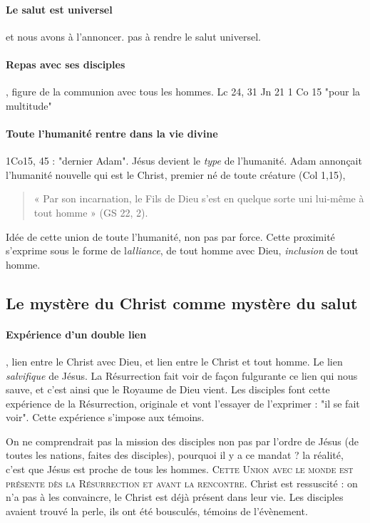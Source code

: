 \paragraph{Le salut est universel} et nous avons à l'annoncer. pas à rendre le salut universel. 

\paragraph{Repas avec ses disciples}, figure de la communion avec tous les hommes. 
Lc 24, 31
Jn 21
1 Co 15 "pour la multitude"

\paragraph{Toute l'humanité rentre dans la vie divine} 1Co15, 45 : "dernier Adam". Jésus devient le \textit{type } de l'humanité. Adam annonçait l'humanité nouvelle qui est le Christ, premier né de toute créature (Col 1,15),  
  
 \begin{quote}
     «  Par  son  incarnation,  le  Fils  de  Dieu  s’est  en  quelque  sorte  uni  lui-même  à  tout  homme  »  (GS 22, 2). 
 \end{quote}
 
 Idée de cette union de toute l'humanité, non pas par force. Cette proximité s'exprime sous le forme de l\textit{alliance}, de tout homme avec Dieu, \textit{inclusion } de tout homme.
    
\subsection{Le mystère du Christ comme mystère du salut}
    
    \paragraph{Expérience d'un double lien}, lien entre le Christ avec Dieu, et lien entre le Christ et tout homme. Le lien \textit{salvifique} de Jésus.
    La Résurrection fait voir de façon fulgurante ce lien qui nous sauve, et c'est ainsi que le Royaume de Dieu vient. Les disciples font cette expérience de la Résurrection, originale et vont l'essayer de l'exprimer : "il se fait voir".
    Cette expérience s'impose aux témoins. 
    
    On ne comprendrait pas la mission des disciples non pas par l'ordre de Jésus (de toutes les nations, faites des disciples), pourquoi il y a ce mandat ? la réalité, c'est que Jésus est proche de tous les hommes. \textsc{Cette Union avec le monde est présente dès la Résurrection et avant la rencontre}. Christ est ressuscité : on n'a pas à les convaincre, le Christ est déjà présent dans leur vie. Les disciples avaient trouvé la perle, ils ont été bousculés, témoins de l'évènement.
    
